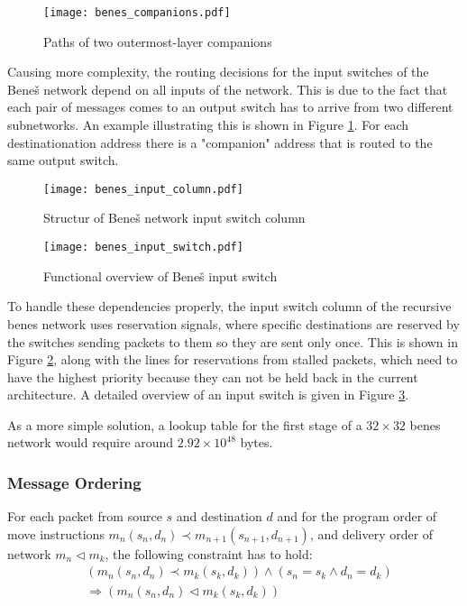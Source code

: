 \begin{figure}[!ht]
	\centering
	\texttt{[image: benes\_companions.pdf]}
	\caption{Paths of two outermost-layer companions}
	\label{fig:benes_companions}
\end{figure}

Causing more complexity, the routing decisions for the input switches of the Beneš network depend on all inputs of the network.
This is due to the fact that each pair of messages comes to an output switch has to arrive from two different subnetworks.
An example illustrating this is shown in Figure \ref{fig:benes_companions}.
For each destinationation address there is a "companion" address that is routed to the same output switch.

\begin{figure}[!ht]
	\centering
	\texttt{[image: benes\_input\_column.pdf]}
	\caption{Structur of Beneš network input switch column}
	\label{fig:benes_switchcolumn_in}
\end{figure}

\begin{figure}[!ht]
	\centering
	\texttt{[image: benes\_input\_switch.pdf]}
	\caption{Functional overview of Beneš input switch}
	\label{fig:benes_switch_in}
\end{figure}

To handle these dependencies properly, the input switch column of the recursive benes network uses reservation signals, where specific destinations are reserved by the switches sending packets to them so they are sent only once.
This is shown in Figure \ref{fig:benes_switchcolumn_in}, along with the lines for reservations from stalled packets, which need to have the highest priority because they can not be held back in the current architecture.
A detailed overview of an input switch is given in Figure \ref{fig:benes_switch_in}.

As a more simple solution, a lookup table for the first stage of a $32\times32$ benes network would require around $2.92\times10^{48}$ bytes.


\FloatBarrier
\subsubsection{Message Ordering}

		For each packet from source $s$ and destination $d$ and for the program order of move instructions $m_n(s_n, d_n) \prec m_{n+1}(s_{n+1}, d_{n+1})$, and delivery order of network $m_n \lhd m_k$, the following constraint has to hold:
	\begin{align*}
		& (m_n(s_n, d_n) \prec m_k(s_k, d_k)) \wedge (s_n = s_k \wedge d_n = d_k) \\
		& \Rightarrow (m_n(s_n, d_n) \lhd m_k(s_k, d_k))
	\end{align*}

